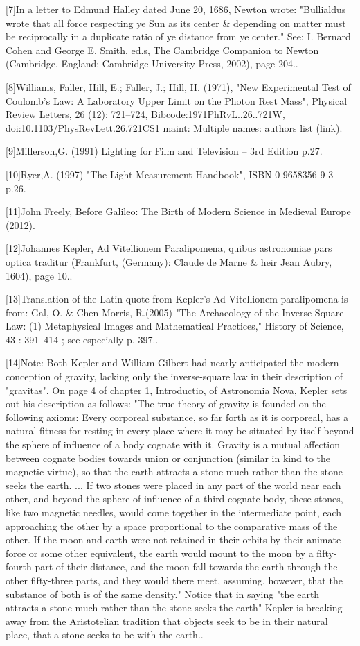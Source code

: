 [7]In a letter to Edmund Halley dated June 20, 1686, Newton wrote: "Bullialdus wrote that all force respecting ye Sun as its center & depending on matter must be reciprocally in a duplicate ratio of ye distance from ye center." See: I. Bernard Cohen and George E. Smith, ed.s, The Cambridge Companion to Newton (Cambridge, England: Cambridge University Press, 2002), page 204..

[8]Williams, Faller, Hill, E.; Faller, J.; Hill, H. (1971), "New Experimental Test of Coulomb's Law: A Laboratory Upper Limit on the Photon Rest Mass", Physical Review Letters, 26 (12): 721–724, Bibcode:1971PhRvL..26..721W, doi:10.1103/PhysRevLett.26.721CS1 maint: Multiple names: authors list (link).

[9]Millerson,G. (1991) Lighting for Film and Television – 3rd Edition p.27.

[10]Ryer,A. (1997) "The Light Measurement Handbook", ISBN 0-9658356-9-3 p.26.

[11]John Freely, Before Galileo: The Birth of Modern Science in Medieval Europe (2012).

[12]Johannes Kepler, Ad Vitellionem Paralipomena, quibus astronomiae pars optica traditur (Frankfurt, (Germany): Claude de Marne & heir Jean Aubry, 1604), page 10..

[13]Translation of the Latin quote from Kepler's Ad Vitellionem paralipomena is from: Gal, O. & Chen-Morris, R.(2005) "The Archaeology of the Inverse Square Law: (1) Metaphysical Images and Mathematical Practices," History of Science, 43 : 391–414 ; see especially p. 397..

[14]Note: Both Kepler and William Gilbert had nearly anticipated the modern conception of gravity, lacking only the inverse-square law in their description of "gravitas". On page 4 of chapter 1, Introductio, of Astronomia Nova, Kepler sets out his description as follows: "The true theory of gravity is founded on the following axioms: Every corporeal substance, so far forth as it is corporeal, has a natural fitness for resting in every place where it may be situated by itself beyond the sphere of influence of a body cognate with it. Gravity is a mutual affection between cognate bodies towards union or conjunction (similar in kind to the magnetic virtue), so that the earth attracts a stone much rather than the stone seeks the earth. ... If two stones were placed in any part of the world near each other, and beyond the sphere of influence of a third cognate body, these stones, like two magnetic needles, would come together in the intermediate point, each approaching the other by a space proportional to the comparative mass of the other. If the moon and earth were not retained in their orbits by their animate force or some other equivalent, the earth would mount to the moon by a fifty-fourth part of their distance, and the moon fall towards the earth through the other fifty-three parts, and they would there meet, assuming, however, that the substance of both is of the same density." Notice that in saying "the earth attracts a stone much rather than the stone seeks the earth" Kepler is breaking away from the Aristotelian tradition that objects seek to be in their natural place, that a stone seeks to be with the earth..

